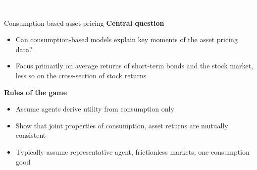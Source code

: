 \documentclass[xcolor=table, aspectratio=169]{beamer}
\newcommand{\alertbf}[1]{\alert{\textbf{#1}}}
\begin{document}
{
\begin{frame}
\begin{center}
\large{
\textcolor{white}{BREAK}    
}
\end{center}
\end{frame}
}


\begin{frame}{Consumption-based asset pricing}
\alertbf{Central question}
\begin{itemize}
\item Can consumption-based models explain key moments of the asset pricing data?
\item Focus primarily on average returns of short-term bonds and the stock market, less so on the cross-section of stock returns
\end{itemize}

\vskip 8pt

\alertbf{Rules of the game}

\begin{itemize}
\item Assume agents derive utility from consumption only
\item Show that joint properties of consumption, asset returns are mutually consistent
\item Typically assume representative agent, frictionless markets, one consumption good
\end{itemize}
\end{frame}
\end{document}
